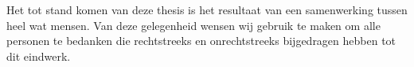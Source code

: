  \par Het tot stand komen van deze thesis is het resultaat van een samenwerking tussen heel wat mensen. Van deze gelegenheid wensen wij gebruik te maken om alle personen te bedanken die rechtstreeks en onrechtstreeks bijgedragen hebben tot dit eindwerk. 